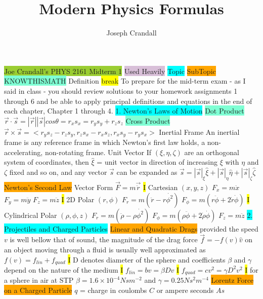 \documentclass[10pt, oneside]{article}   	%
\title{Modern Physics Formulas}
\author{Joseph Crandall}
\begin{document}

\colorbox{YellowGreen}{Joe Crandall's PHYS 2161 Midterm 1}
\colorbox{Thistle}{Used Heavily}
\colorbox{Cyan}{Topic}
\colorbox{Orange}{SubTopic}
\colorbox{Aquamarine}{KNOWTHISMATH}
\colorbox{RubineRed}{Definition}
\colorbox{Yellow}{break}
To prepare for the mid-term exam - as I said in class - you should review solutions to your homework assignments 1 through 6 and be able to apply principal definitions and equations in the end of each chapter, Chapter 1 through 4. 
\colorbox{Cyan}{1. Newton's Laws of Motion}
\colorbox{Aquamarine}{Dot Product}
$\vec{r} \cdot \vec{s} = |\vec{r}| |\vec{s}| cos\theta = r_xs_x=r_ys_y+r_zs_z$
\colorbox{Aquamarine}{Cross Product}
$\vec{r} \times \vec{s} = <r_ys_z-r_zs_y, r_zs_x-r_xs_z,r_xs_y-r_ys_x>$
\colorbox{RubineRed}{Inertial Frame} An inertial frame is any reference frame in which Newton's first law holds, a non-accelerating, non-rotating frame. 
\colorbox{RubineRed}{Unit Vector} If $(\xi , \eta, \zeta)$ are an orthogonal system of coordinates, then $\hat{\xi}$ = unit vector in direction of increasing $\xi$ with $\eta$ and $\zeta$ fixed and so on, and any vector $\vec{s}$ can be expanded as $\vec{s} = |\vec{s}|_{\xi}\hat{\xi} + |\vec{s}|_{\eta}\hat{\eta} + |\vec{s}|_{\zeta}\hat{\zeta}$
\colorbox{Orange}{Newton's Second Law}
Vector Form $\vec{F} = m\vec{\ddot{r}}$
\hl{I}
Cartesian $(x,y,z)$ $F_x=m\ddot{x}$ $F_y=m\ddot{y}$ $F_z=m\ddot{z}$
\hl{I}
2D Polar $(r,\phi)$ $F_r=m(\ddot{r}-r\dot{\phi^2})$ $F_\phi=m(r\ddot{\phi}+2\dot{r}\dot{\phi})$
\hl{I}
Cylindrical Polar $(\rho,\phi,z)$ $F_r=m(\ddot{\rho}-\rho \dot{\phi^2})$ $F_\phi=m(\rho \ddot{\phi}+2\dot{\rho}\dot{\phi})$ $F_z = m\ddot{z}$
\colorbox{Cyan}{2. Projectiles and Charged Particles}
\colorbox{Orange}{Linear and Quadratic Drags}
provided the speed $v$ is well bellow that of sound, the magnitude of the drag force  $\vec{f} = -f(v)\hat{v}$ on an object moving through a fluid is usually well approximated as $f(v) = f_{lin} + f_{quad}$ 
\hl{I} 
D denotes diameter of the sphere and coefficients $\beta$ and $\gamma$ depend on the nature of the medium
\hl{I}
$f_{lin} = bv = \beta D v$
\hl{I}
$f_{quad}=cv^2=\gamma D^2 v^2$
\hl{I}
for a sphere in air at STP $\beta=1.6\times10^{-4} Nsm^{-2}$ and $\gamma = 0.25 Ns^2m^{-4}$
\colorbox{Orange}{Lorentz Force on a Charged Particle}
$q$ = charge in coulombs $C$ or ampere seconds $As$
\end{document}
